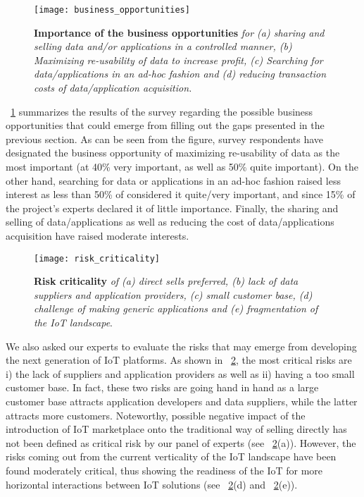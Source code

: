 \documentclass[preprint,10pt,5p]{elsarticle}
\begin{document}
\begin{figure}[t]
  \centering
  \texttt{[image: business\_opportunities]}
  \caption{\textbf{Importance of the business opportunities} \textsl{for (a) sharing and
    selling data and/or applications in a controlled manner, (b)
    Maximizing re-usability of data to increase profit, (c) Searching
    for data/applications in an ad-hoc fashion and (d) reducing
    transaction costs of data/application acquisition.}}
  \label{fig:survey_business_opp}
\end{figure}

\figurename{~\ref{fig:survey_business_opp}} summarizes the results of
the survey regarding the possible business opportunities that could
emerge from filling out the gaps presented in the previous section.
As can be seen from the figure, survey respondents have designated the business opportunity of
maximizing re-usability of data as the most important (at 40\% very
important, as well as 50\% quite important). 
On the other hand, searching for data or applications in an ad-hoc
fashion raised less interest as less than 50\% of considered it quite/very important, 
and since 15\% of the project's experts declared
it of little importance.
Finally, the sharing and selling of data/applications as well as
reducing the cost of data/applications acquisition have raised
moderate interests. 

\begin{figure}[t]
  \centering
  \texttt{[image: risk\_criticality]}
  \caption{\textbf{Risk criticality} \textsl{of (a) direct sells preferred, (b) lack of
  data suppliers and application providers, (c) small customer base,
  (d) challenge of making generic applications and (e) fragmentation
  of the IoT landscape}.}
  \label{fig:survey_risk}
\end{figure}

We also asked our experts to evaluate the risks that may emerge
from developing the next generation of IoT platforms. 
As shown in \figurename{~\ref{fig:survey_risk}}, the most critical
risks are i) the lack of suppliers and application providers as well as
ii) having a too small customer base. 
In fact, these two risks are going hand in hand as a large customer
base attracts application developers and data suppliers, while the
latter attracts more customers.
Noteworthy, possible negative impact of the
introduction of IoT marketplace onto the traditional way of selling
directly has not been
defined as critical risk by our panel of experts (see \figurename{~\ref{fig:survey_risk}}(a)).
However, the risks coming out from the current verticality of the IoT
landscape have been found moderately critical, thus showing the
readiness of the IoT for more horizontal interactions between IoT
solutions (see \figurename{~\ref{fig:survey_risk}}(d) and \figurename{~\ref{fig:survey_risk}}(e)).
\end{document}
